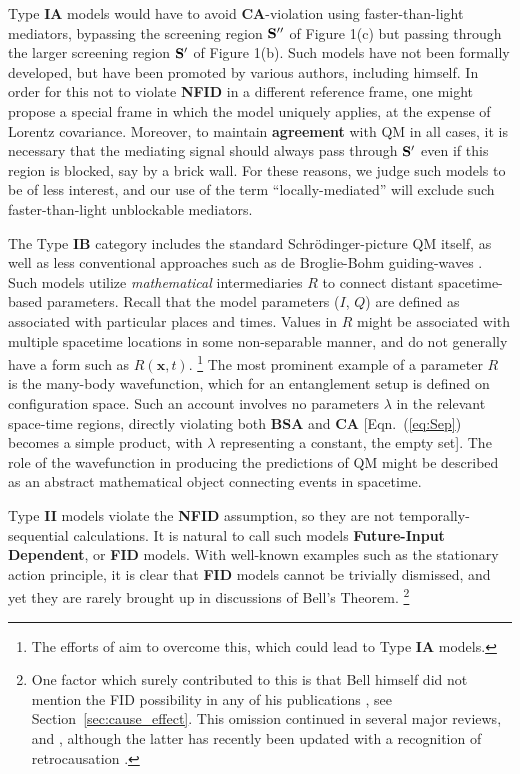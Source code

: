\documentclass[rmp, aps, preprint, longbibliography]{revtex4-1}
\begin{document}
Type {\bf IA} models would have to avoid {\bf CA}-violation using faster-than-light mediators, bypassing the screening region $\bf{S''}$ of Figure 1(c) but passing through the larger screening region $\bf{S'}$ of Figure 1(b).  Such models have not been formally developed, but have been promoted by various authors, including \textcite{bell1981} himself.  In order for this not to violate {\bf NFID} in a different reference frame, one might propose a special frame in which the model uniquely applies, at the expense of Lorentz covariance.  
Moreover, to maintain {\bf agreement} with QM in all cases, it is necessary that the mediating signal should always pass through $\bf{S'}$ even if this region is blocked, say by a brick wall.  For these reasons, we judge such models to be of less interest, and our use of the term ``locally-mediated'' will exclude such faster-than-light unblockable mediators.

The Type {\bf IB} category includes the standard Schr\"odinger-picture QM itself, as well as less conventional approaches such as de Broglie-Bohm guiding-waves \cite{bohm1952}.  Such models utilize \emph{mathematical} intermediaries $R$ to connect distant spacetime-based parameters.  Recall that the model parameters ($I$, $Q$) are defined as associated with particular places and times.  Values in $R$ might be associated with multiple spacetime locations in some non-separable manner, and do not generally have a form such as $R(\bm{x},t)$.%
\footnote{The efforts of \textcite{norsen2010,stoica2019} aim to  overcome this, which could lead to Type {\bf IA} models.}
The most prominent example of a parameter $R$ is the many-body wavefunction, which for an entanglement setup is defined on configuration space.  Such an account involves no parameters ${\lambda}$ in the relevant space-time regions, directly violating both {\bf BSA} and {\bf CA} [Eqn.~(\ref{eq:Sep}) becomes a simple product, with ${\lambda}$ representing a constant, the empty set].  The role of the wavefunction in producing the predictions of QM might be described as an abstract mathematical object connecting events in spacetime.

Type {\bf II} models violate the {\bf NFID} assumption, so they are not temporally-sequential calculations.  It is natural to call such models {\bf Future-Input Dependent}, or {\bf FID} models.  With well-known examples such as the stationary action principle, it is clear that {\bf FID} models cannot be trivially dismissed, and yet they are rarely brought up in discussions of Bell's Theorem.%
\footnote{One factor which surely contributed to this is that Bell himself did not mention the FID possibility in any of his publications \cite{bell2004}, see Section~\ref{sec:cause_effect}.  This omission continued in several major reviews, \textcite{goldstein2011} and \textcite{shimony2017}, although the latter has recently been updated with a recognition of retrocausation \cite{myrvold2019}.}
\end{document}
